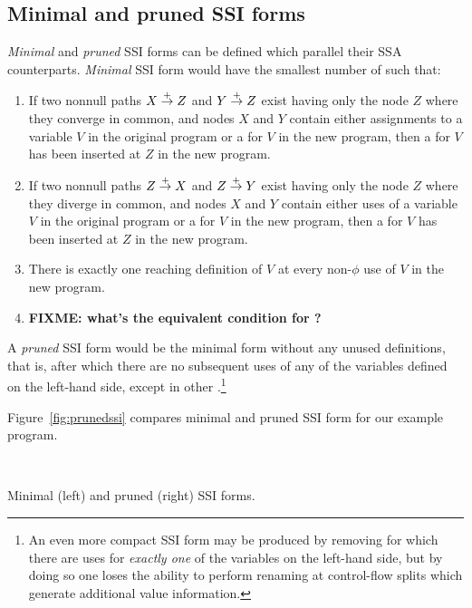 \documentclass[12pt,titlepage,twoside]{article}
\begin{document}
\subsection{Minimal and pruned SSI forms}
\emph{Minimal} and \emph{pruned} SSI forms can be defined which
parallel their SSA counterparts.  \emph{Minimal} SSI form would have the
smallest number of  such that:
\begin{enumerate}
\item If two nonnull paths $X \stackrel{+}{\rightarrow} Z$ and $Y \stackrel{+}{\rightarrow} Z$
exist having only the node $Z$ where they converge in common,
and nodes $X$ and $Y$ contain either assignments to a variable $V$ in the
original program or a \phisigfunction[or] for $V$ in the new program,
then a \phifunction{} for $V$ has been inserted at $Z$ in the new program.
\item If two nonnull paths $Z \stackrel{+}{\rightarrow} X$ and $Z \stackrel{+}{\rightarrow} Y$
exist having only the node $Z$ where they diverge in common,
and nodes $X$ and $Y$ contain either uses of a variable $V$ in the
original program or a \phisigfunction[or] for $V$ in the new program,
then a \sigfunction{} for $V$ has been inserted at $Z$ in the new program.
\item There is exactly one reaching definition of $V$ at every
non-$\phi$ use of $V$ in the new program.
\item \textbf{FIXME: what's the equivalent condition for ?}
\end{enumerate}

A \emph{pruned} SSI form would be the minimal form without any unused
definitions, that is,  after which there are no
subsequent uses of any of the variables defined on the left-hand side,
except in other .\footnote{An even more
compact SSI form may be produced by removing  for which
there are uses for \emph{exactly one} of the variables on the
left-hand side, but by doing so one loses the ability to perform
renaming at control-flow splits which generate additional value
information.}

Figure~\vref{fig:prunedssi} compares minimal and pruned SSI form for
our example program.
\begin{myfigure}
\begin{center}
 \vline\ 
\end{center}
\caption[Minimal and pruned SSI forms.]
{Minimal (left) and pruned (right) SSI forms.}
\label{fig:prunedssi}
\end{myfigure}
\end{document}
